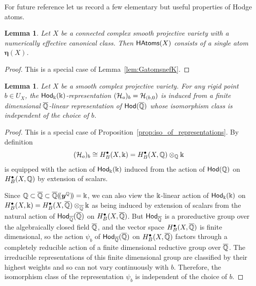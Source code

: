 \documentclass[twoside,leqno]{article}
\numberwithin{equation}{section}
\theoremstyle{plain}
\newtheorem{lemma}[equation]{Lemma}
\theoremstyle{definition}
\begin{document}
For future reference let us record a few elementary but useful properties of Hodge atoms.

\begin{lemma} \label{lem:nefK}
Let $X$ be a connected complex smooth projective variety with a numerically effective canonical class.
Then $\mathsf{HAtoms}(X)$ consists of a single atom
$\boldsymbol{\eta}(X)$.
\end{lemma}
\begin{proof}
This is a special case of Lemma~\ref{lem:GatomsnefK}.
\end{proof}

\begin{lemma} \label{lem:acindependence} Let $X$ be a smooth complex projective variety.
  For any rigid point $b \in U_{X}$, the $\mathsf{Hod}_{\Bbbk}(\Bbbk)$-representation $(\mathcal H_{o})_b = \mathcal H_{(b,0})$ is induced from a finite dimensional $\overline{\mathbb Q}$-linear representation of $\mathsf{Hod}(\overline{\mathbb Q})$ whose isomorphism class is independent of the choice of $b$.
\end{lemma}
\begin{proof}
This is a special case of Proposition~\ref{prop:iso_of_representations}. By definition 
\[
(\mathcal H_{o})_b \cong H^{\bullet}_{B}(X,\Bbbk) = H^{\bullet}_{B}(X,\mathbb Q)\otimes_{\mathbb Q} \Bbbk
\]
is equipped with the action of $\mathsf{Hod}_{\Bbbk}(\Bbbk)$ induced from the action of $\mathsf{Hod}(\mathbb Q)$ on $H^{\bullet}_{B}(X,\mathbb Q)$ by extension of scalars. 

Since $\mathbb Q \subset \overline{\mathbb Q} \subset \overline{\mathbb Q}(\!(\boldsymbol{y}^{\mathbb Q})\!) = \Bbbk$,
we  can also view the $\Bbbk$-linear action of $\mathsf{Hod}_{\Bbbk}(\Bbbk)$ on 
$H^{\bullet}_{B}(X,\Bbbk) = H^{\bullet}_{B}(X,\overline{\mathbb Q})\otimes_{\overline{\mathbb Q}} \Bbbk$
as being induced by extension of scalars from the natural action of $\mathsf{Hod}_{\overline{\mathbb Q}}(\overline{\mathbb Q})$ on $H^{\bullet}_{B}(X,\overline{\mathbb Q})$.
But $\mathsf{Hod}_{\overline{\mathbb Q}}$  is a proreductive group over the  algebraically closed field $\overline{\mathbb Q}$, and the vector space 
$H^{\bullet}_{B}(X,\overline{\mathbb Q})$ is finite dimensional, so 
the action $\psi_{b}$ of $\mathsf{Hod}_{\overline{\mathbb Q}}(\overline{\mathbb Q})$ on $H^{\bullet}_{B}(X,\overline{\mathbb Q})$ factors through a completely reducible action of a finite dimensional reductive group over $\overline{\mathbb Q}$. The irreducible representations of this finite dimensional group are classified by their highest weights and so can not vary continuously with $b$.
  Therefore, the isomorphism class of the representation $\psi_{b}$ is independent of the choice of $b$.
\end{proof}
\end{document}
